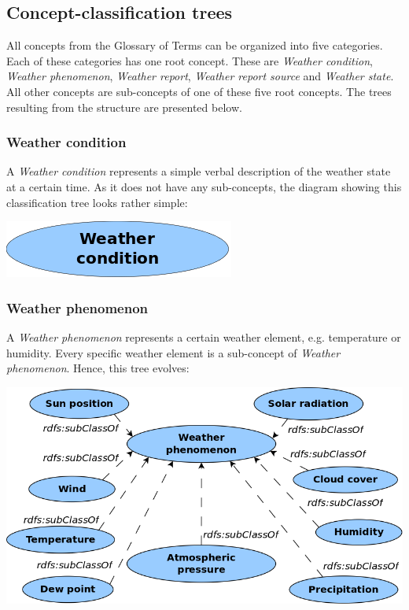 \subsection{Concept-classification trees}
\label{sec:concept_classification_trees}

All concepts from the Glossary of Terms can be organized into five categories. Each of these categories has one root concept. These are \emph{Weather condition}, \emph{Weather phenomenon}, \emph{Weather report}, \emph{Weather report source} and \emph{Weather state}. All other concepts are sub-concepts of one of these five root concepts. The trees resulting from the structure are presented below.

\subsubsection{Weather condition}

A \emph{Weather condition} represents a simple verbal description of the weather state at a certain time. As it does not have any sub-concepts, the diagram showing this classification tree looks rather simple:

\begin{center}
  \includegraphics[width=.4\textwidth]{figures/diagrams/weather-condition.png}
\end{center}

\subsubsection{Weather phenomenon}

A \emph{Weather phenomenon} represents a certain weather element, e.g. temperature or humidity. Every specific weather element is a sub-concept of \emph{Weather phenomenon}. Hence, this tree evolves:

\begin{center}
  \includegraphics[width=.8\textwidth]{figures/diagrams/weather-phenomenon.png}
\end{center}

